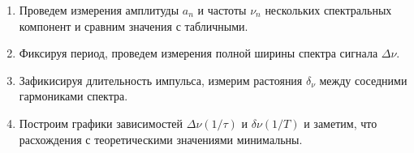 \documentclass[14pt, a4paper]{report}
\begin{document}
\begin{enumerate}
\item Проведем измерения амплитуды $a_n$ и частоты $\nu_n$ нескольких спектральных компонент и сравним значения с табличными.

\begin{table}[H]
\centering
{}
\end{table}

\item Фиксируя период, проведем измерения полной ширины спектра сигнала $\Delta\nu$.

\begin{table}[H]
\centering
{}
\end{table}

\item Зафикисируя длительность импульса, измерим растояния $\delta_\nu$ между соседними гармониками спектра.

\begin{table}[H]
\centering
{}
\end{table}

\item Построим графики зависимостей $\Delta\nu(1/\tau)$ и $\delta\nu(1/T)$ и заметим, что расхождения с теоретическими значениями минимальны.


\end{enumerate}
\end{document}
